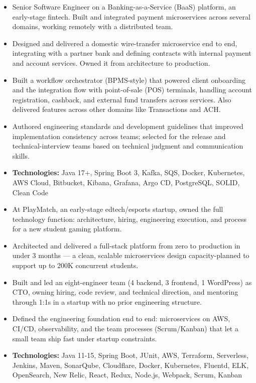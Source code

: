 \documentclass[10pt,a4paper,normalphoto]{altacv}
\newcommand{\jobguard}{\vspace{2pt}\Needspace{8\baselineskip}}
\newcommand{\techline}[1]{\vspace{3pt}\item[--]{\footnotesize\linespread{0.92}\selectfont \textbf{Technologies:} #1}}
\begin{document}
\jobguard
{}
\begin{itemize}
\item[\phantom{{\small\textbullet}}] Senior Software Engineer on a Banking-as-a-Service (BaaS) platform, an early-stage fintech. Built and integrated payment microservices across several domains, working remotely with a distributed team.
\newline
\item Designed and delivered a domestic wire-transfer microservice end to end, integrating with a partner bank and defining contracts with internal payment and account services. Owned it from architecture to production.
\item Built a workflow orchestrator (BPMS-style) that powered client onboarding and the integration flow with point-of-sale (POS) terminals, handling account registration, cashback, and external fund transfers across services. Also delivered features across other domains like Transactions and ACH.
\item Authored engineering standards and development guidelines that improved implementation consistency across teams; selected for the release and technical-interview teams based on technical judgment and communication skills.
\techline{Java 17+, Spring Boot 3, Kafka, SQS, Docker, Kubernetes, AWS Cloud, Bitbucket, Kibana, Grafana, Argo CD, PostgreSQL, SOLID, Clean Code}
\end{itemize}

\newpage

\begin{itemize}
\item[\phantom{{\small\textbullet}}] At PlayMatch, an early-stage edtech/esports startup, owned the full technology function: architecture, hiring, engineering execution, and process for a new student gaming platform.
\newline
\item Architected and delivered a full-stack platform from zero to production in under 3 months --- a clean, scalable microservices design capacity-planned to support up to 200K concurrent students.
\item Built and led an eight-engineer team (4 backend, 3 frontend, 1 WordPress) as CTO, owning hiring, code review, and technical direction, and mentoring through 1:1s in a startup with no prior engineering structure.
\item Defined the engineering foundation end to end: microservices on AWS, CI/CD, observability, and the team processes (Scrum/Kanban) that let a small team ship fast under startup constraints.
\techline{Java 11-15, Spring Boot, JUnit, AWS, Terraform, Serverless, Jenkins, Maven, SonarQube, Cloudflare, Docker, Kubernetes, Fluentd, ELK, OpenSearch, New Relic, React, Redux, Node.js, Webpack, Scrum, Kanban}
\end{itemize}
\divider
\end{document}
